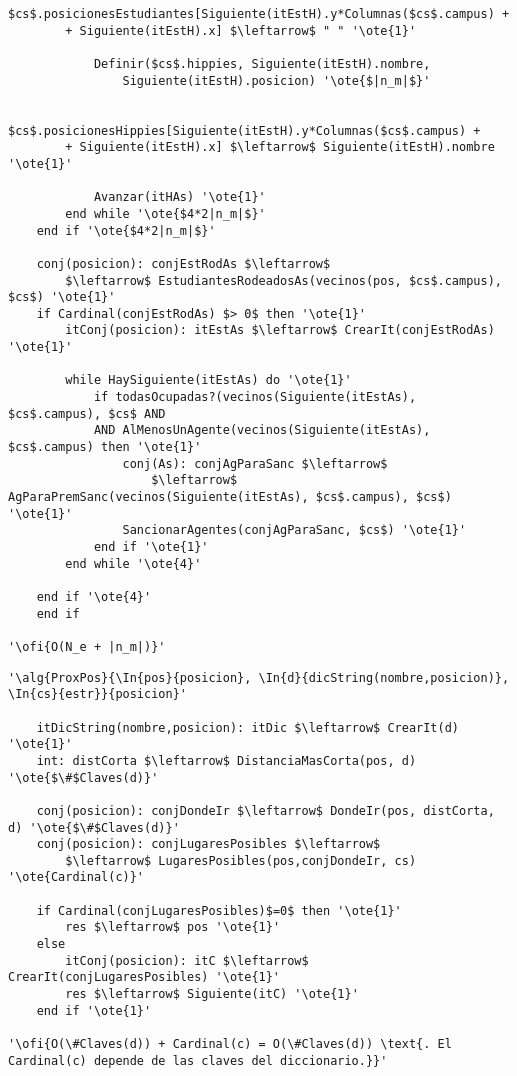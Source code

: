 \begin{lstlisting}[mathescape]
			$cs$.posicionesEstudiantes[Siguiente(itEstH).y*Columnas($cs$.campus) +
		+ Siguiente(itEstH).x] $\leftarrow$ " " '\ote{1}'

			Definir($cs$.hippies, Siguiente(itEstH).nombre,
				Siguiente(itEstH).posicion) '\ote{$|n_m|$}'

			$cs$.posicionesHippies[Siguiente(itEstH).y*Columnas($cs$.campus) +
		+ Siguiente(itEstH).x] $\leftarrow$ Siguiente(itEstH).nombre '\ote{1}'

			Avanzar(itHAs) '\ote{1}'
		end while '\ote{$4*2|n_m|$}'
	end if '\ote{$4*2|n_m|$}'

	conj(posicion): conjEstRodAs $\leftarrow$
		$\leftarrow$ EstudiantesRodeadosAs(vecinos(pos, $cs$.campus), $cs$) '\ote{1}'
	if Cardinal(conjEstRodAs) $> 0$ then '\ote{1}'
		itConj(posicion): itEstAs $\leftarrow$ CrearIt(conjEstRodAs) '\ote{1}'

		while HaySiguiente(itEstAs) do '\ote{1}'
			if todasOcupadas?(vecinos(Siguiente(itEstAs), $cs$.campus), $cs$ AND
			AND AlMenosUnAgente(vecinos(Siguiente(itEstAs), $cs$.campus) then '\ote{1}'
				conj(As): conjAgParaSanc $\leftarrow$
					$\leftarrow$ AgParaPremSanc(vecinos(Siguiente(itEstAs), $cs$.campus), $cs$) '\ote{1}'
				SancionarAgentes(conjAgParaSanc, $cs$) '\ote{1}'
			end if '\ote{1}'
		end while '\ote{4}'

	end if '\ote{4}'
	end if

'\ofi{O(N_e + |n_m|)}'
\end{lstlisting}

\begin{lstlisting}[mathescape]
'\alg{ProxPos}{\In{pos}{posicion}, \In{d}{dicString(nombre,posicion)}, \In{cs}{estr}}{posicion}'

	itDicString(nombre,posicion): itDic $\leftarrow$ CrearIt(d) '\ote{1}'
	int: distCorta $\leftarrow$ DistanciaMasCorta(pos, d) '\ote{$\#$Claves(d)}'

	conj(posicion): conjDondeIr $\leftarrow$ DondeIr(pos, distCorta, d) '\ote{$\#$Claves(d)}'
	conj(posicion): conjLugaresPosibles $\leftarrow$
		$\leftarrow$ LugaresPosibles(pos,conjDondeIr, cs) '\ote{Cardinal(c)}'

	if Cardinal(conjLugaresPosibles)$=0$ then '\ote{1}'
		res $\leftarrow$ pos '\ote{1}'
	else
		itConj(posicion): itC $\leftarrow$ CrearIt(conjLugaresPosibles) '\ote{1}'
		res $\leftarrow$ Siguiente(itC) '\ote{1}'
	end if '\ote{1}'

'\ofi{O(\#Claves(d)) + Cardinal(c) = O(\#Claves(d)) \text{. El Cardinal(c) depende de las claves del diccionario.}}'
\end{lstlisting}

